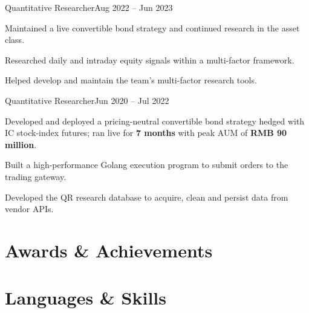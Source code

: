 \documentclass[a4paper,10pt]{article}
\begin{document}
  {Quantitative Researcher}{Aug 2022 -- Jun 2023}
\begin{resumeItems}
  \item Maintained a live convertible bond strategy and continued research in the asset class.
  \item Researched daily and intraday equity signals within a multi-factor framework.
  \item Helped develop and maintain the team's multi-factor research tools.
\end{resumeItems}

  {Quantitative Researcher}{Jun 2020 -- Jul 2022}
\begin{resumeItems}
  \item Developed and deployed a pricing-neutral convertible bond strategy hedged with IC stock-index futures; ran live for \textbf{7 months} with peak AUM of \textbf{RMB 90 million}.
  \item Built a high-performance Golang execution program to submit orders to the trading gateway.
  \item Developed the QR research database to acquire, clean and persist data from vendor APIs.
\end{resumeItems}

\section{Awards \& Achievements}


\section{Languages \& Skills}

\end{document}
